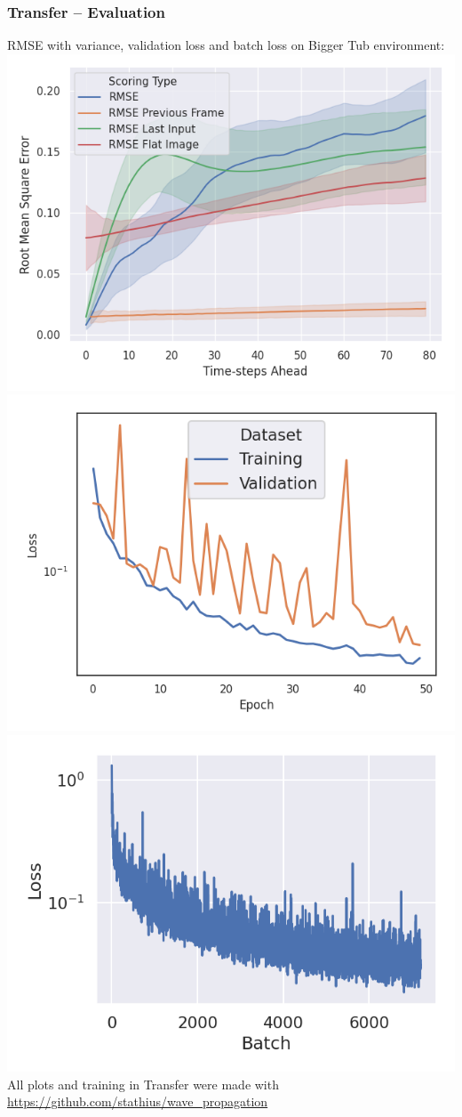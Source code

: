 \begin{frame}
    \frametitle{Transfer -- Evaluation}

RMSE with variance, validation loss and batch loss on Bigger Tub environment:\\[\baselineskip]

\mbox{\includegraphics[height=.5\paperheight, width=.33\textwidth]{./Ressourcen/Praesentation/Bilder/WaveTransfer/DFP/Bigger_Tub_RMSE_Quality_start_15.png}}%
\mbox{\includegraphics[height=.5\paperheight, width=.33\textwidth]{./Ressourcen/Praesentation/Bilder/WaveTransfer/DFP/Validation_Loss.png}}
\mbox{\includegraphics[height=.5\paperheight, width=.33\textwidth]{./Ressourcen/Praesentation/Bilder/WaveTransfer/DFP/Batch_Loss.png}}
All plots and training in Transfer were made with \url{https://github.com/stathius/wave_propagation}
\end{frame}
\clearpage

